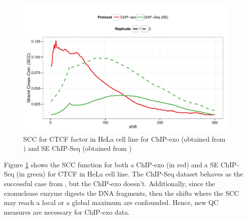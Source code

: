 \documentclass[11pt]{article}\usepackage[]{graphicx}\usepackage[]{color}
\begin{document}
\begin{figure}[H]
  \centering  
\includegraphics[width = .7\textwidth]{../figs/for_paper/scc_ctcf.pdf}
  \caption{SCC for CTCF factor in HeLa cell line for ChIP-exo (obtained from \cite{exo1}) and SE ChIP-Seq (obtained from \cite{encode1}) }
  \label{fig:scc}
\end{figure}

Figure \ref{fig:scc} shows the SCC function for both a ChIP-exo (in
red) and a SE ChIP-Seq (in green) for CTCF in HeLa cell line. The
ChIP-Seq dataset behaves as the successful case from \cite{encode_qc},
but the ChIP-exo doesn't. Additionally, since the exonuclease enzyme
digests the DNA fragments, then the shifts where the SCC may reach a
local or a global maximum are confounded. Hence, new QC measures are
necessary for ChIP-exo data.
\end{document}
